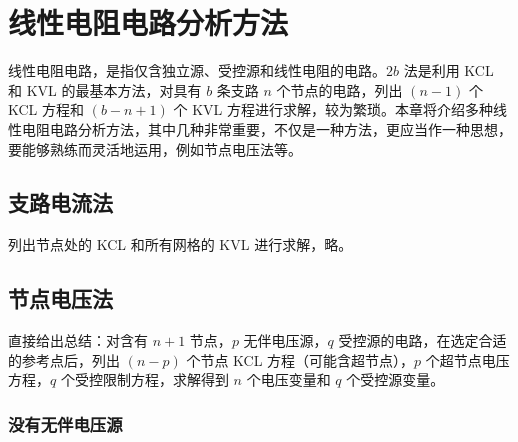 \documentclass[UTF8]{report}
\theoremstyle{MyLineTheoremStyle} %
\theoremstyle{MyBlockTheoremStyle} %
\theoremstyle{MySubsubsectionStyle} %
\begin{document}
\chapter{线性电阻电路分析方法}
线性电阻电路，是指仅含独立源、受控源和线性电阻的电路。$2b$ 法是利用 KCL 和 KVL 的最基本方法，对具有 $b$ 条支路 $n$ 个节点的电路，列出 $(n -1)$ 个 KCL 方程和 $(b - n +1)$ 个 KVL 方程进行求解，较为繁琐。本章将介绍多种线性电阻电路分析方法，其中几种非常重要，不仅是一种方法，更应当作一种思想，要能够熟练而灵活地运用，例如节点电压法等。


\section{支路电流法}

列出节点处的 KCL 和所有网格的 KVL 进行求解，略。

\section{节点电压法}

直接给出总结：对含有 $n+1$ 节点，$p$ 无伴电压源，$q$ 受控源的电路，在选定合适的参考点后，列出 $(n-p)$ 个节点 KCL 方程（可能含超节点），$p$ 个超节点电压方程，$q$ 个受控限制方程，求解得到 $ n $ 个电压变量和 $q$ 个受控源变量。

\subsection{没有无伴电压源}
\end{document}
